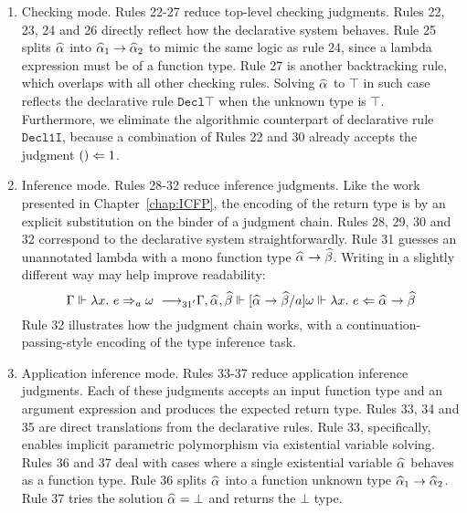 \begin{enumerate}
    \item Checking mode. Rules 22-27 reduce top-level checking judgments.
            Rules 22, 23, 24 and 26 directly reflect how the declarative system behaves.
            Rule 25 splits $\al$ into $\al[1] \to \al[2]$ to mimic the same logic as rule 24,
            since a lambda expression must be of a function type.
            Rule 27 is another backtracking rule, which overlaps with all other checking rules.
            Solving $\al$ to $\top$ in such case reflects
            the declarative rule $\mathtt{Decl{\top}}$ when the unknown type is $\top$.
            Furthermore, we eliminate the algorithmic counterpart of declarative rule
            $\mathtt{Decl1I}$, because a combination of Rules 22 and 30 already
            accepts the judgment $() \Leftarrow 1$.
    
    \item Inference mode. Rules 28-32 reduce inference judgments.
            Like the work presented in Chapter~\ref{chap:ICFP}, the encoding of the return type is by
            an explicit substitution on the binder of a judgment chain.
            Rules 28, 29, 30 and 32 correspond to the declarative system straightforwardly.
            Rule 31 guesses an unannotated lambda with a mono function type $\al \to \bt$.
            Writing in a slightly different way may help improve readability:
            \[ \Gm \Vdash \lam e \To_a \jg \rrule{31'}
                \Gm, \al, \bt \Vdash [\al \to \bt / a]\jg \Vdash \lam e \Lto \al \to \bt \]
            Rule 32 illustrates how the judgment chain works, with a continuation-passing-style
            encoding of the type inference task.
    
    \item Application inference mode. Rules 33-37 reduce application inference judgments.
            Each of these judgments accepts an input function type and an argument expression
            and produces the expected return type.
            Rules 33, 34 and 35 are direct translations from the declarative rules.
            Rule 33, specifically, enables implicit parametric polymorphism via
            existential variable solving.
            Rules 36 and 37 deal with cases where a single existential variable
            $\al$ behaves as a function type.
            Rule 36 splits $\al$ into a function unknown type $\al[1] \to \al[2]$.
            Rule 37 tries the solution $\al = \bot$ and returns the $\bot$ type.


\end{enumerate}

